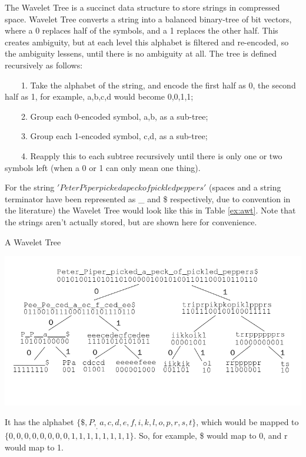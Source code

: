 The Wavelet Tree is a succinct data structure to store strings in compressed space. Wavelet Tree converts a string into a balanced binary-tree of bit vectors, where a 0 replaces half of the symbols, and a 1 replaces the other half. This creates ambiguity, but at each level this alphabet is filtered and re-encoded, so the ambiguity lessens, until there is no ambiguity at all.
The tree is defined recursively as follows:

\ \ \ \ 1. Take the alphabet of the string, and encode the first half as 0, the second half as 1, for example, {a,b,c,d} would become {0,0,1,1};

\ \ \ \ 2. Group each 0-encoded symbol, {a,b}, as a sub-tree;

\ \ \ \ 3. Group each 1-encoded symbol, {c,d}, as a sub-tree;

\ \ \ \ 4. Reapply this to each subtree recursively until there is only one or two symbols left (when a 0 or 1 can only mean one thing).

For the string \('Peter Piper picked a peck of pickled peppers'\) (spaces and a string terminator have been represented as \_ and \$ respectively, due to convention in the literature) the Wavelet Tree would look like this in Table \ref{ex:awt}. Note that the strings aren’t actually stored, but are shown here for convenience.

\begin{table}[!htp]
  \caption{A Wavelet Tree}
  \label{ex:awt}
  \begin{center}
    \includegraphics[width=1\textwidth]{Figures/graph1.png}
  \end{center}
\end{table}

It has the alphabet \(\{\$,P,_,a,c,d,e,f,i,k,l,o,p,r,s,t\}\), which would be mapped to \(\{0,0,0,0,0,0,0,0,1,1,1,1,1,1,1,1\}\). So, for example, \$ would map to 0, and r would map to 1.

